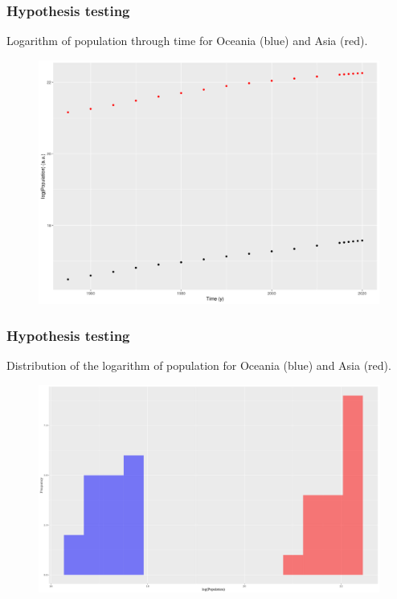 \documentclass[
	11pt, %
]{beamer}
\begin{document}
\begin{frame}
	\frametitle{Hypothesis testing}
	Logarithm of population through time for Oceania (blue) and Asia (red).
	\begin{figure}
		\includegraphics[width=.75\textwidth]{asia_oceania.png}
	\end{figure}
\end{frame}

\begin{frame}
	\frametitle{Hypothesis testing}
	Distribution of the logarithm of population for Oceania (blue) and Asia (red).
	\begin{figure}
		\includegraphics[width=.75\textwidth]{asia_oceania_hist.png}
	\end{figure}
\end{frame}
\end{document}
